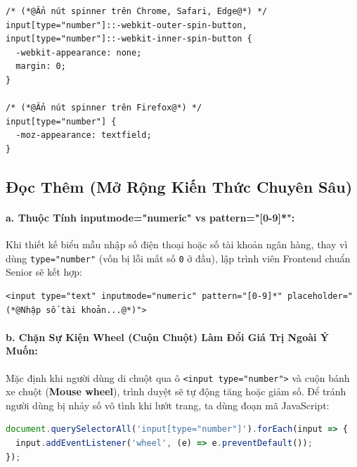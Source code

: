 \documentclass[11pt,oneside]{book}
\newcommand{\codeinline}[1]{\textcolor{accentOrange}{\texttt{#1}}}
\newcommand{\term}[1]{\textbf{\textcolor{primaryBlue}{#1}}}
\begin{document}
\begin{codeWindow}
\begin{lstlisting}[language=HTML5]
/* (*@Ẩn nút spinner trên Chrome, Safari, Edge@*) */
input[type="number"]::-webkit-outer-spin-button,
input[type="number"]::-webkit-inner-spin-button {
  -webkit-appearance: none;
  margin: 0;
}

/* (*@Ẩn nút spinner trên Firefox@*) */
input[type="number"] {
  -moz-appearance: textfield;
}
\end{lstlisting}
\end{codeWindow}

\subsection{Đọc Thêm (Mở Rộng Kiến Thức Chuyên Sâu)}
\label{subsec:number_advanced_readmore}

\paragraph{a. Thuộc Tính inputmode="numeric" vs pattern="[0-9]*":}
Khi thiết kế biểu mẫu nhập số điện thoại hoặc số tài khoản ngân hàng, thay vì dùng \codeinline{type="number"} (vốn bị lỗi mất số \codeinline{0} ở đầu), lập trình viên Frontend chuẩn Senior sẽ kết hợp:
\begin{codeWindow}
\begin{lstlisting}[language=HTML5]
<input type="text" inputmode="numeric" pattern="[0-9]*" placeholder="(*@Nhập số tài khoản...@*)">
\end{lstlisting}
\end{codeWindow}

\paragraph{b. Chặn Sự Kiện Wheel (Cuộn Chuột) Làm Đổi Giá Trị Ngoài Ý Muốn:}
Mặc định khi người dùng di chuột qua ô \codeinline{<input type="number">} và cuộn bánh xe chuột (\term{Mouse wheel}), trình duyệt sẽ tự động tăng hoặc giảm số. Để tránh người dùng bị nhảy số vô tình khi lướt trang, ta dùng đoạn mã JavaScript:

\begin{codeWindow}[Chặn cuộn chuột đổi số trên input type="number"]
\begin{lstlisting}[language=JavaScript]
document.querySelectorAll('input[type="number"]').forEach(input => {
  input.addEventListener('wheel', (e) => e.preventDefault());
});
\end{lstlisting}
\end{codeWindow}
\end{document}
